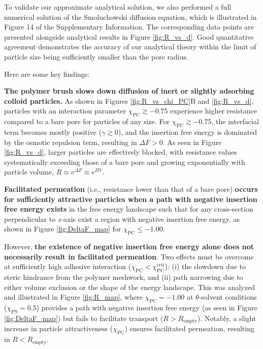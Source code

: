 \documentclass[12pt, a4paper]{article}
\begin{document}
To validate our approximate analytical solution, we also performed a full numerical solution of the Smoluchowski diffusion equation, which is illustrated in 
Figure 14 of the Supplementary Information.
The corresponding data points are presented alongside analytical results in Figure \ref{fig:R_vs_d}.
Good quantitative agreement demonstrates the accuracy of our analytical theory within the limit of particle size being sufficiently smaller than the pore radius.

Here are some key findings:

\textbf{The polymer brush slows down diffusion of inert or slightly adsorbing colloid particles.}
As shown in Figures \ref{fig:R_vs_chi_PC}B and \ref{fig:R_vs_d}, particles with an interaction parameter $\chi_{\text{PC}} \gtrsim -0.75$ experience higher resistance compared to a bare pore for particles of any size.
For $\chi_{\text{PC}} \gtrsim -0.75$, the interfacial term becomes mostly positive ($\gamma \gtrsim 0$), and the insertion free energy is dominated by the osmotic repulsion term, resulting in $\Delta F > 0$.
As seen in Figure \ref{fig:R_vs_d}, larger particles are effectively blocked, with resistance values systematically exceeding those of a bare pore and growing exponentially with particle volume, $R \approx e^{\Delta F} \approx e^{\Pi V}$.

\textbf{Facilitated permeation} (i.e., resistance lower than that of a bare pore) \textbf{occurs for sufficiently attractive particles when a path with negative insertion free energy exists} in the free energy landscape such that for any cross-section perpendicular to $z$-axis exist a region with negative insertion free energy,
as shown in Figure \ref{fig:DeltaF_map} for $\chi_{\text{PC}} \le -1.00$.

However, \textbf{the existence of negative insertion free energy alone does not necessarily result in facilitated permeation}.
Two effects must be overcome at sufficiently high adhesive interaction ($\chi_{\text{PC}} < \chi^{\text{crit}}_{\text{PC}}$): (i) the slowdown due to steric hindrance from the polymer meshwork, and (ii) path narrowing due to either volume exclusion or the shape of the energy landscape.
This was analyzed and illustrated in Figure \ref{fig:R_map}, where $\chi_{\text{PC}} = -1.00$ at $\theta$-solvent conditions ($\chi_{\text{PS}} = 0.5$) provides a path with negative insertion free energy (as seen in Figure \ref{fig:DeltaF_map}) but fails to facilitate transport ($R > R_{\text{empty}}$).
Notably, a slight increase in particle attractiveness ($\chi_{\text{PC}}$) ensures facilitated permeation, resulting in $R < R_{\text{empty}}$.
\end{document}
